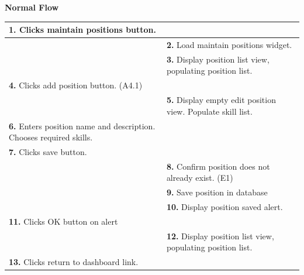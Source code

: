 \documentclass[letterpaper,12pt]{report}
\begin{document}
{ \centering \textbf{Normal Flow}
\begin{center}
\xuchead
\begin{tabular}{| p{8.5cm} | p{8.5cm} |}
\hline
\textbf{1.} Clicks maintain positions button. & \\
\hline
& \textbf{2.} Load maintain positions widget. \\
\hline
& \textbf{3.} Display position list view, populating position list. \\
\hline
\textbf{4.} Clicks add position button. (A4.1) & \\
\hline
& \textbf{5.} Display empty edit position view. Populate skill list. \\
\hline
\textbf{6.} Enters position name and description. Chooses required skills. & \\
\hline
\textbf{7.} Clicks save button. & \\
\hline
& \textbf{8.} Confirm position does not already exist. (E1) \\
\hline
& \textbf{9.} Save position in database \\
\hline
& \textbf{10.} Display position saved alert. \\
\hline
\textbf{11.} Clicks OK button on alert & \\
\hline
& \textbf{12.} Display position list view, populating position list. \\
\hline
\textbf{13.} Clicks return to dashboard link. & \\
\hline



\end{tabular}
\end{center}}
\end{document}

